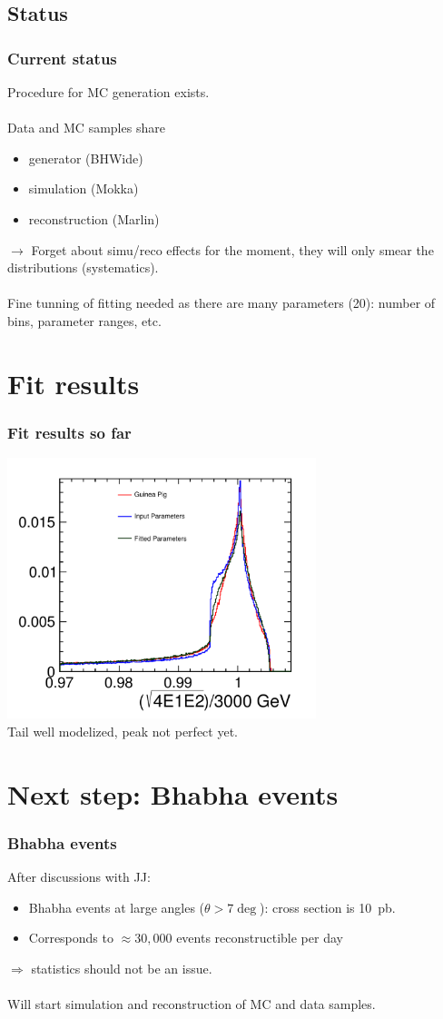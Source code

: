 \documentclass[handout]{beamer}
\begin{document}
\subsection{Status}
\begin{frame}
\frametitle{Current status}
Procedure for MC generation exists.\\
~\\
Data and MC samples share 
\begin{itemize}
  \item generator (BHWide)
  \item simulation (Mokka)
  \item reconstruction (Marlin)
\end{itemize}
$\to$ Forget about simu/reco effects for the moment, they will only smear
the distributions (systematics).\\
~\\
Fine tunning of fitting needed as there are many parameters (20): number of
bins, parameter ranges, etc.
\end{frame}


\section{Fit results}
\begin{frame}
\frametitle{Fit results so far}
\centering
\includegraphics[width=9cm]{final_res}\\
Tail well modelized, peak not perfect yet.
\end{frame}

\section{Next step: Bhabha events}
\begin{frame}
\frametitle{Bhabha events}
After discussions with JJ:
\begin{itemize}
  \item Bhabha events at large angles ($\theta > 7\deg$): cross section is
  10~pb.
  \item Corresponds to $\approx 30,000$ events reconstructible per day
\end{itemize}
$\Rightarrow$ statistics should not be an issue.\\
~\\
Will start simulation and reconstruction of MC and data samples.
\end{frame}
\end{document}
